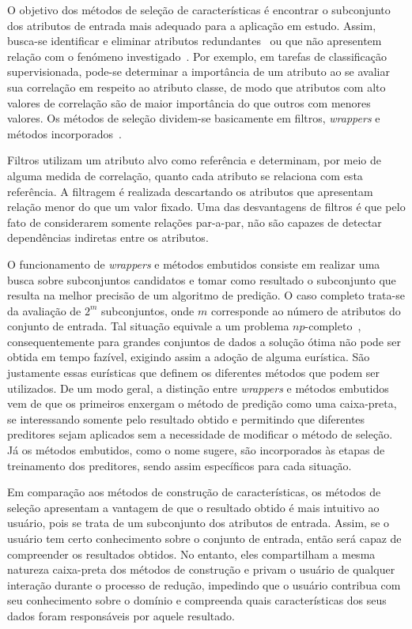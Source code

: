 O objetivo dos métodos de seleção de características é
encontrar o subconjunto  dos atributos de entrada mais
adequado para a aplicação em estudo. Assim, busca-se
identificar e eliminar atributos
redundantes~\cite{Kohavi1997} ou que não apresentem relação
com o fenómeno investigado~\cite{Nilsson2007}.  Por exemplo,
em tarefas de classificação supervisionada, pode-se
determinar a importância de um atributo ao se avaliar sua
correlação em respeito ao atributo classe, de modo que
atributos com alto valores de correlação são de maior importância
do que outros com menores valores.  Os métodos de seleção
dividem-se basicamente em filtros, \emph{wrappers} e métodos
incorporados~\cite{Guyon2003}. 

Filtros utilizam um atributo alvo como referência e
determinam, por meio de alguma medida de correlação, quanto
cada atributo se relaciona com esta referência. A filtragem
é realizada descartando os atributos que apresentam relação
menor do que um valor fixado. Uma das desvantagens de
filtros é que pelo fato de considerarem somente relações
par-a-par, não são capazes de detectar dependências
indiretas entre os atributos. 

O funcionamento de \emph{wrappers} e métodos embutidos
consiste em realizar uma busca sobre subconjuntos candidatos
e tomar como resultado o subconjunto que resulta na melhor
precisão de um algoritmo de predição. O caso completo
trata-se da avaliação de $2^m$ subconjuntos, onde $m$
corresponde ao número de atributos do conjunto de entrada.
Tal situação equivale a um problema
$np$-completo~\cite{Amaldi1998}, consequentemente para
grandes conjuntos de dados a solução ótima não pode ser
obtida em tempo fazível, exigindo assim a adoção de alguma
eurística. São justamente essas eurísticas que definem os
diferentes métodos que podem ser utilizados. De um modo
geral, a distinção entre \emph{wrappers} e métodos embutidos
vem de que os primeiros enxergam o método de predição como uma
caixa-preta, se interessando somente pelo resultado obtido e
permitindo que diferentes preditores sejam aplicados sem a
necessidade de modificar o método de seleção. Já os métodos
embutidos, como o nome sugere, são incorporados às etapas de
treinamento dos preditores, sendo assim específicos para
cada situação. 

Em comparação aos métodos de construção de características, os métodos de seleção
apresentam a vantagem de que o resultado obtido é mais
intuitivo ao usuário, pois se trata de um subconjunto dos
atributos de entrada. Assim, se o usuário tem certo
conhecimento sobre o conjunto de entrada, então será capaz
de compreender os resultados obtidos. No entanto, eles
compartilham a mesma natureza caixa-preta dos métodos de
construção e privam o usuário de qualquer interação durante o
processo de redução, impedindo que o usuário contribua com
seu conhecimento sobre o domínio e compreenda quais
características dos seus dados foram responsáveis por aquele
resultado.

